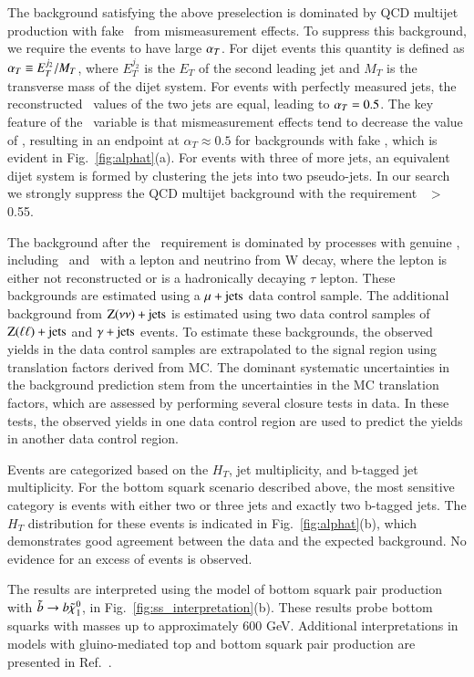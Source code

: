 The background satisfying the above preselection is dominated by QCD multijet production with fake \met\ from mismeasurement effects. To suppress this background,
we require the events to have large $\alpha_{T}$. For dijet events this quantity is defined as $\alpha_{T} \equiv E_{T}^{j_2} / M_{T}$, where $E_{T}^{j_2}$ is the $E_T$
of the second leading jet and $M_T$ is the transverse mass of the dijet system. 
For events with perfectly measured jets, the reconstructed \pt\ values of the two jets are equal, leading to $\alpha_{T}=0.5$. 
The key feature of the \alphat\ variable is that mismeasurement effects tend to decrease the value of \alphat,
resulting in an endpoint at $\alpha_T\approx0.5$ for backgrounds with fake \met, which is evident in Fig.~\ref{fig:alphat}(a).
For events with three of more jets, an equivalent dijet 
system is formed by  clustering the jets into two pseudo-jets. In our search we strongly suppress the QCD multijet background with 
the requirement \alphat\ $>$ 0.55.

The background after the \alphat\ requirement is dominated by processes with genuine \met, including \ttljets\ and \wjets\ with a lepton and neutrino from W decay,
where the lepton is either not reconstructed or is a hadronically decaying $\tau$ lepton. 
These backgrounds are estimated using a $\mu+\rm{jets}$ data control sample.
The additional background from $\rm{Z}(\nu\nu)+\rm{jets}$ is estimated using two data control samples of $\rm{Z}(\ell\ell)+\rm{jets}$ and  $\gamma+\rm{jets}$ events. To estimate these backgrounds, the observed yields in the data control samples are extrapolated to the
signal region using translation factors derived from MC. The dominant systematic uncertainties in the background prediction stem from the uncertainties
in the MC translation factors, which are assessed by performing several closure tests in data. In these tests, the observed yields in one data control region
are used to predict the yields in another data control region.

Events are categorized based on the $H_T$, jet multiplicity, and b-tagged jet multiplicity. For the bottom squark scenario described above, the most sensitive
category is events with either two or three jets and exactly two b-tagged jets. The $H_T$ distribution for these events is indicated in Fig.~\ref{fig:alphat}(b),
which demonstrates good agreement between the data and the expected background. No evidence for an excess of events is observed.

The results are interpreted  using the model of bottom squark pair production with $\tilde{b}\to b\tilde{\chi}_{1}^{0}$, in Fig.~\ref{fig:ss_interpretation}(b).
These results probe bottom squarks with masses up to approximately 600 GeV. Additional interpretations in models with gluino-mediated
top and bottom squark pair production are presented in Ref.~\cite{ref:alphat}.

